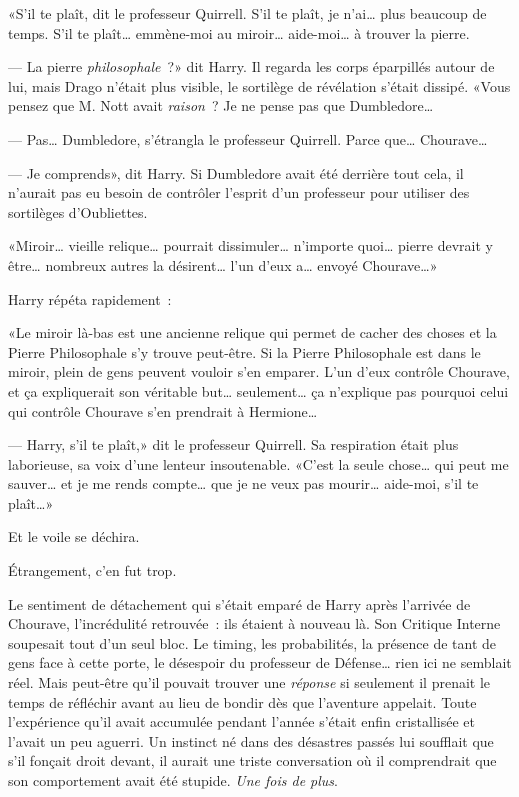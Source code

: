 «S'il te plaît, dit le professeur Quirrell. S'il te plaît, je n'ai… plus beaucoup de temps. S'il te plaît… emmène-moi au miroir… aide-moi… à trouver la pierre.

--- La pierre \emph{philosophale}~?» dit Harry. Il regarda les corps éparpillés autour de lui, mais Drago n'était plus visible, le sortilège de révélation s'était dissipé. «Vous pensez que M. Nott avait \emph{raison}~? Je ne pense pas que Dumbledore…

--- Pas… Dumbledore, s'étrangla le professeur Quirrell. Parce que… Chourave…

--- Je comprends», dit Harry. Si Dumbledore avait été derrière tout cela, il n'aurait pas eu besoin de contrôler l'esprit d'un professeur pour utiliser des sortilèges d'Oubliettes.

«Miroir… vieille relique… pourrait dissimuler… n'importe quoi… pierre devrait y être… nombreux autres la désirent… l'un d'eux a… envoyé Chourave…»

Harry répéta rapidement~:

«Le miroir là-bas est une ancienne relique qui permet de cacher des choses et la Pierre Philosophale s'y trouve peut-être. Si la Pierre Philosophale est dans le miroir, plein de gens peuvent vouloir s'en emparer. L'un d'eux contrôle Chourave, et ça expliquerait son véritable but… seulement… ça n'explique pas pourquoi celui qui contrôle Chourave s'en prendrait à Hermione…

--- Harry, s'il te plaît,» dit le professeur Quirrell. Sa respiration était plus laborieuse, sa voix d'une lenteur insoutenable. «C'est la seule chose… qui peut me sauver… et je me rends compte… que je ne veux pas mourir… aide-moi, s'il te plaît…»

Et le voile se déchira.

Étrangement, c'en fut trop.

Le sentiment de détachement qui s'était emparé de Harry après l'arrivée de Chourave, l'incrédulité retrouvée~: ils étaient à nouveau là. Son Critique Interne soupesait tout d'un seul bloc. Le timing, les probabilités, la présence de tant de gens face à cette porte, le désespoir du professeur de Défense… rien ici ne semblait réel. Mais peut-être qu'il pouvait trouver une \emph{réponse} si seulement il prenait le temps de réfléchir avant au lieu de bondir dès que l'aventure appelait. Toute l'expérience qu'il avait accumulée pendant l'année s'était enfin cristallisée et l'avait un peu aguerri. Un instinct né dans des désastres passés lui soufflait que s'il fonçait droit devant, il aurait une triste conversation où il comprendrait que son comportement avait été stupide. \emph{Une fois de plus}.

